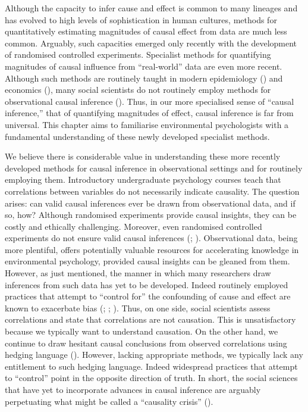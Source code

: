 \documentclass[
  singlecolumn]{article}
\begin{document}
Although the capacity to infer cause and effect is common to many
lineages and has evolved to high levels of sophistication in human
cultures, methods for quantitatively estimating magnitudes of causal
effect from data are much less common. Arguably, such capacities emerged
only recently with the development of randomised controlled experiments.
Specialist methods for quantifying magnitudes of causal influence from
``real-world'' data are even more recent. Although such methods are
routinely taught in modern epidemiology () and economics
(), many
social scientists do not routinely employ methods for observational
causal inference ().
Thus, in our more specialised sense of ``causal inference,'' that of
quantifying magnitudes of effect, causal inference is far from
universal. This chapter aims to familiarise environmental psychologists
with a fundamental understanding of these newly developed specialist
methods.

We believe there is considerable value in understanding these more
recently developed methods for causal inference in observational
settings and for routinely employing them. Introductory undergraduate
psychology courses teach that correlations between variables do not
necessarily indicate causality. The question arises: can valid causal
inferences ever be drawn from observational data, and if so, how?
Although randomised experiments provide causal insights, they can be
costly and ethically challenging. Moreover, even randomised controlled
experiments do not ensure valid causal inferences
(;
).
Observational data, being more plentiful, offers potentially valuable
resources for accelerating knowledge in environmental psychology,
provided causal insights can be gleaned from them. However, as just
mentioned, the manner in which many researchers draw inferences from
such data has yet to be developed. Indeed routinely employed practices
that attempt to ``control for'' the confounding of cause and effect are
known to exacerbate bias (; ;
). Thus, on
one side, social scientists assess correlations and state that
correlations are not causation. This is unsatisfactory because we
typically want to understand causation. On the other hand, we continue
to draw hesitant causal conclusions from observed correlations using
hedging language (). However,
lacking appropriate methods, we typically lack any entitlement to such
hedging language. Indeed widespread practices that attempt to
``control'' point in the opposite direction of truth. In short, the
social sciences that have yet to incorporate advances in causal
inference are arguably perpetuating what might be called a ``causality
crisis'' ().
\end{document}
